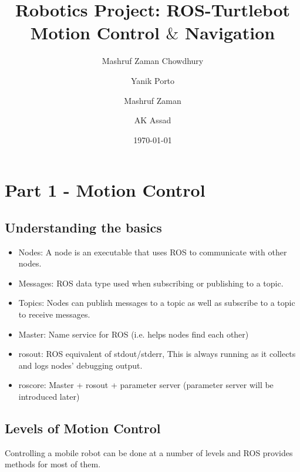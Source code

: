 \documentclass[10pt,a4paper]{article}
\author{Mashruf Zaman Chowdhury}
\begin{document}
\title{Robotics Project: ROS-Turtlebot Motion Control $\&$ Navigation} \author{Yanik Porto \and Mashruf Zaman \and AK Assad} \date{\today}
\maketitle

\lstset{language=Python}%

\tableofcontents

\newpage
\section[Part 1 - Motion Control]{Part 1 - Motion Control}

\subsection{Understanding the basics}

\begin{itemize}
\itemsep0em 
\item Nodes: A node is an executable that uses ROS to communicate with other nodes.
\item Messages: ROS data type used when subscribing or publishing to a topic.
\item Topics: Nodes can publish messages to a topic as well as subscribe to a topic to receive messages.
\item Master: Name service for ROS (i.e. helps nodes find each other)
\item rosout: ROS equivalent of stdout/stderr, This is always running as it collects and logs nodes' debugging output.
\item roscore: Master + rosout + parameter server %
(parameter server will be introduced later)
\end{itemize}

\subsection{Levels of Motion Control}
Controlling a mobile robot can be done at a number of levels and ROS provides methods for most of them.
\end{document}
